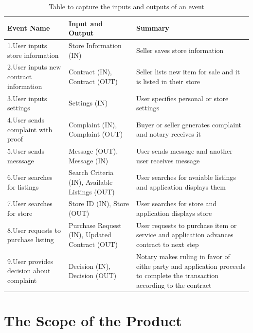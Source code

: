\documentclass{article}
\begin{document}
\begin{table}[H]
\color{red}
\centering
\begin{tabu} to 0.8\textwidth {|| X[l] | X[l] | X[l] ||}
 \hline
 \textbf {Event Name} & \textbf{Input and Output} & \textbf{Summary} \\
 \hline
 1.User inputs store information & Store Information (IN) & Seller saves store information \\
 \hline
 2.User inputs new contract information & Contract (IN), Contract (OUT) & Seller lists new item for sale and it is listed in their store \\
 \hline
 3.User inputs settings & Settings (IN) & User specifies personal or store settings \\
 \hline
 4.User sends complaint with proof & Complaint (IN), Complaint (OUT) & Buyer or seller generates complaint and notary receives it \\
 \hline
 5.User sends messsage & Message (OUT), Message (IN) & User sends message and another user receives message \\
 \hline
 6.User searches for listings & Search Criteria (IN), Available Listings (OUT) & User searches for avaiable listings and application displays them \\
 \hline
 7.User searches for store & Store ID (IN), Store (OUT) & User searches for store and application displays store \\
 \hline
 8.User requests to purchase listing & Purchase Request (IN), Updated Contract (OUT) & User requests to purchase item or service and application advances contract to next step \\
 \hline
 9.User provides decision about complaint & Decision (IN), Decision (OUT) & Notary makes ruling in favor of eithe party and application proceeds to complete the transaction according to the contract \\
 \hline
\end{tabu}
\caption{Table to capture the inputs and outputs of an event}
\label{table:2}
\end{table}

\section{The Scope of the Product}
\end{document}
